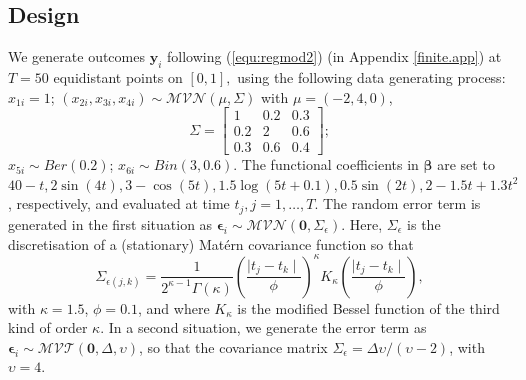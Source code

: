 \documentclass[12pt, A4]{article}
\newcommand{\RegCoe}{\textbf{b}}
\begin{document}
        \subsection{Design}
        We generate outcomes $\textbf{y}_i$ following (\ref{equ:regmod2}) (in Appendix \ref{finite.app}) at $T = 50$ equidistant points on $[0,1],$ using the following data generating process: $x_{1i} = 1$; $(x_{2i}, x_{3i}, x_{4i}) \sim \mathcal{MVN} (\mu, \Sigma)$ with $\mu = (-2, 4, 0)$, 
            $$
                \Sigma = 
                \begin{bmatrix}
                     1 & 0.2 & 0.3\\
                    0.2 & 2 & 0.6 \\
                    0.3 & 0.6 & 0.4
                \end{bmatrix};
            $$ 
        $x_{5i} \sim Ber(0.2)$; $x_{6i} \sim Bin(3, 0.6)$.
        The functional coefficients in $\boldsymbol{\beta}$ are set to $40-t, 2\sin(4t), 3 - \cos(5t), 1.5\log(5t + 0.1), 0.5\sin(2t), 2 - 1.5t + 1.3t^2$, respectively, and evaluated at time $t_j, j = 1, \dots, T.$
        The random error term is generated in the first situation as $\boldsymbol{\epsilon}_i \sim \mathcal{MVN} (\mathbf{0}, \Sigma_\epsilon)$. Here, $\Sigma_\epsilon$ is the discretisation of a (stationary) Matérn covariance function so that 
            $$
            \Sigma_{\epsilon (j, k)} = \frac{1}{2^{\kappa - 1} \Gamma(\kappa)} \left( \frac{\mid t_j - t_k \mid}{\phi} \right)^\kappa K_\kappa \left( \frac{\mid t_j - t_k \mid}{\phi} \right),
            $$
        with $\kappa = 1.5$, $\phi = 0.1$, and where $K_\kappa$ is the modified Bessel function of the third kind of order $\kappa$. 
        In a second situation, we generate the error term as $\boldsymbol{\epsilon}_i \sim \mathcal{MVT} (\mathbf{0}, \Delta, \upsilon)$, so that the covariance matrix $\Sigma_\epsilon = \Delta \upsilon/(\upsilon - 2)$, with $\upsilon = 4$.
\end{document}
